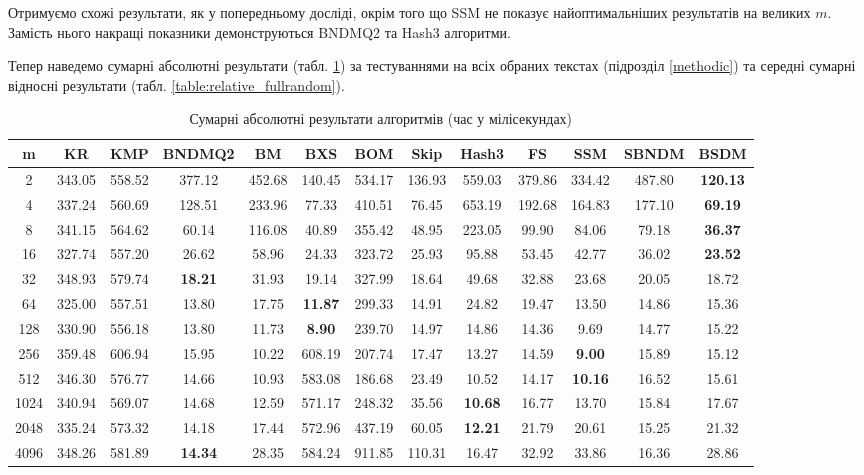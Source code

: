 \documentclass[a4paper,14pt]{extarticle} %
\begin{document}
			Отримуємо схожі результати, як у попередньому досліді, окрім того що SSM не показує найоптимальніших результатів на великих $m$. Замість нього накращі показники демонструються BNDMQ2 та Hash3 алгоритми.
			
			Тепер наведемо сумарні абсолютні результати (табл. \ref{table:absolute_fullrandom}) за тестуваннями на всіх обраних текстах (підрозділ \ref{methodic}) та середні сумарні відносні результати (табл. \ref{table:relative_fullrandom}).

			\begin{table}[h]
				\centering
				\scriptsize
				\begin{tabular}{|c|c|c|c|c|c|c|c|c|c|c|c|c|}
				\hline
				\textbf{m} & \textbf{KR} & \textbf{KMP} & \textbf{BNDMQ2} & \textbf{BM} & \textbf{BXS} & \textbf{BOM} & \textbf{Skip} & \textbf{Hash3} & \textbf{FS} & \textbf{SSM} & \textbf{SBNDM} & \textbf{BSDM} \\
				\hline
				2 & 343.05 & 558.52 & 377.12 & 452.68 & 140.45 & 534.17 & 136.93 & 559.03 & 379.86 & 334.42 & 487.80 & \textbf{120.13} \\
				\hline
				4 & 337.24 & 560.69 & 128.51 & 233.96 & 77.33 & 410.51 & 76.45 & 653.19 & 192.68 & 164.83 & 177.10 & \textbf{69.19} \\
				\hline
				8 & 341.15 & 564.62 & 60.14 & 116.08 & 40.89 & 355.42 & 48.95 & 223.05 & 99.90 & 84.06 & 79.18 & \textbf{36.37} \\
				\hline
				16 & 327.74 & 557.20 & 26.62 & 58.96 & 24.33 & 323.72 & 25.93 & 95.88 & 53.45 & 42.77 & 36.02 & \textbf{23.52} \\
				\hline
				32 & 348.93 & 579.74 & \textbf{18.21} & 31.93 & 19.14 & 327.99 & 18.64 & 49.68 & 32.88 & 23.68 & 20.05 & 18.72 \\
				\hline
				64 & 325.00 & 557.51 & 13.80 & 17.75 & \textbf{11.87} & 299.33 & 14.91 & 24.82 & 19.47 & 13.50 & 14.86 & 15.36 \\
				\hline
				128 & 330.90 & 556.18 & 13.80 & 11.73 & \textbf{8.90} & 239.70 & 14.97 & 14.86 & 14.36 & 9.69 & 14.77 & 15.22 \\
				\hline
				256 & 359.48 & 606.94 & 15.95 & 10.22 & 608.19 & 207.74 & 17.47 & 13.27 & 14.59 & \textbf{9.00} & 15.89 & 15.12 \\
				\hline
				512 & 346.30 & 576.77 & 14.66 & 10.93 & 583.08 & 186.68 & 23.49 & 10.52 & 14.17 & \textbf{10.16} & 16.52 & 15.61 \\
				\hline
				1024 & 340.94 & 569.07 & 14.68 & 12.59 & 571.17 & 248.32 & 35.56 & \textbf{10.68} & 16.77 & 13.70 & 15.84 & 17.67 \\
				\hline
				2048 & 335.24 & 573.32 & 14.18 & 17.44 & 572.96 & 437.19 & 60.05 & \textbf{12.21} & 21.79 & 20.61 & 15.25 & 21.32 \\
				\hline
				4096 & 348.26 & 581.89 & \textbf{14.34} & 28.35 & 584.24 & 911.85 & 110.31 & 16.47 & 32.92 & 33.86 & 16.36 & 28.86 \\
				\hline
				\end{tabular}
				\caption{Сумарні абсолютні результати алгоритмів (час у мілісекундах)}
				\label{table:absolute_fullrandom}
				\end{table}
\end{document}
